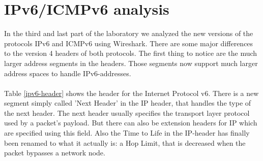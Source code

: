\chapter{IPv6/ICMPv6 analysis}
\label{ipv6}
In the third and last part of the laboratory we analyzed the new versions of the protocols IPv6 and ICMPv6 using Wireshark. There are some major differences to the version 4 headers of both protocols. The first thing to notice are the much larger address segments in the headers. Those segments now support much larger address spaces to handle IPv6-addresses. 
\\\\
Table \ref{ipv6-header} shows the header for the Internet Protocol v6.
There is a new segment simply called 'Next Header' in the IP header, that handles the type of the next header. The next header usually specifies the transport layer protocol used by a packet's payload. But there can also be extension headers for IP which are specified using this field.
Also the Time to Life in the IP-header has finally been renamed to what it actually is: a Hop Limit, that is decreased when the packet bypasses a network node. 
